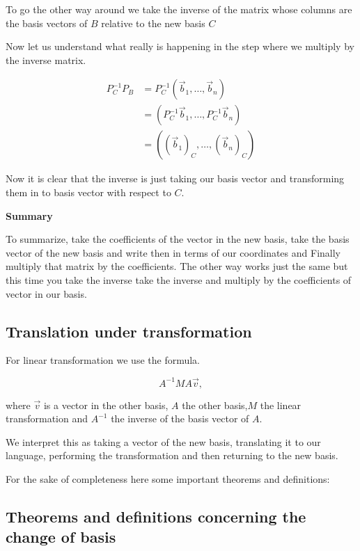 To go the other way around we take the inverse of the matrix whose columns are the basis vectors of \(B\)
relative to the new basis \(C\)
\vspace{\baselineskip}

Now let us understand what really is happening in the step where we multiply by the inverse matrix.

\begin{align*}
P_{C}^{-1} P_B &= P_{C}^{-1}(\vec{b}_1, \dots, \vec{b}_n) \\
&= (P_{C}^{-1}\vec{b}_1, \dots, P_{C}^{-1}\vec{b}_n)\\
&= ({(\vec{b}_1)}_C, \dots, {(\vec{b}_n)}_C)
\end{align*}

Now it is clear that the inverse is just taking our basis vector and transforming
them in to basis vector with respect to \(C\).
\vspace{\baselineskip}

\textbf{Summary}
\vspace{\baselineskip}

To summarize, take the coefficients of the vector in the new basis,
take the basis vector of the new basis and write then in terms of our coordinates
and Finally multiply that matrix by the coefficients. The other way works 
just the same but this time you take the inverse take the inverse and multiply
by the coefficients of vector in our basis.

\subsection{Translation under transformation}

For linear transformation we use the formula.

\[A^{-1} M A \vec{v},\]

where \(\vec{v}\) is a vector in the other basis, \(A\) the
other basis,\(M\) the linear transformation and \(A^{-1}\) the inverse of
the basis vector of \(A\).
\vspace{\baselineskip}

We interpret this as taking a vector of the new basis, translating it to our language,
performing the transformation and then returning to the new basis.
\vspace{\baselineskip}

For the sake of completeness here some important theorems and definitions:

\subsection{Theorems and definitions concerning the change of basis}

